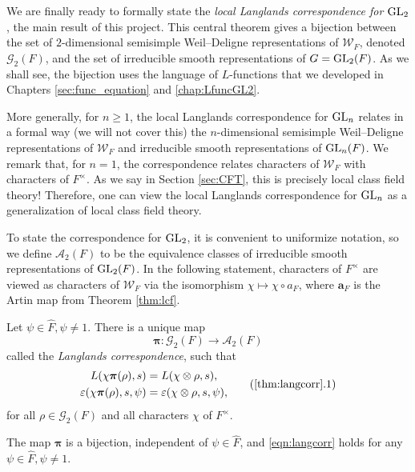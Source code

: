 We are finally ready to formally state the \textit{local Langlands correspondence for $\mathrm{GL}_2$}, the main result of this project. This central theorem gives a bijection between the set of $2$-dimensional semisimple Weil--Deligne representations of $\mathcal{W}_F$, denoted $\mathcal{G}_2(F)$, and the set of irreducible smooth representations of $G=\mathrm{GL}_2(F)$. As we shall see, the bijection uses the language of $L$-functions that we developed in Chapters \ref{sec:func_equation} and \ref{chap:LfuncGL2}. 

More generally, for $n\geq 1$, the local Langlands correspondence for $\mathrm{GL}_n$ relates in a formal way (we will not cover this) the $n$-dimensional semisimple Weil--Deligne representations of $\mathcal{W}_F$ and irreducible smooth representations of $\mathrm{GL}_n(F)$. We remark that, for $n=1$, the correspondence relates characters of $\mathcal{W}_F$ with characters of $F^\times$. As we say in Section \ref{sec:CFT}, this is precisely local class field theory! Therefore, one can view the local Langlands correspondence for $\mathrm{GL}_n$ as a generalization of local class field theory.

To state the correspondence for $\mathrm{GL}_2$, it is convenient to uniformize notation, so we define $\mathcal{A}_2(F)$ to be the equivalence classes of irreducible smooth representations of $\mathrm{GL}_2(F)$. In the following statement, characters of $F^\times$ are viewed as characters of $\mathcal{W}_F$ via the isomorphism $\chi\mapsto\chi\circ a_F$, where $\mathbf{a}_F$ is the Artin map from Theorem \ref{thm:lcf}.


\begin{thm}\label{thm:langcorr}
    Let $\psi\in\hat{F},\psi\neq 1$. There is a unique map 
    $$\bm\pi:\mathcal{G}_2(F)\longrightarrow\mathcal{A}_2(F)$$
    called the \textit{Langlands correspondence}, such that 
    \begin{equation}
        \begin{split}
            L(\chi\bm\pi(\rho),s)&=L(\chi\otimes\rho,s),\\
            \varepsilon(\chi\bm\pi(\rho),s,\psi)&=\varepsilon(\chi\otimes\rho,s,\psi),
        \end{split}
        \label{eqn:langcorr}\tag{\ref{thm:langcorr}.1}
    \end{equation}
    for all $\rho\in\mathcal{G}_2(F)$ and all characters $\chi$ of $F^\times$.

    The map $\bm\pi$ is a bijection, independent of $\psi\in\hat{F}$, and \eqref{eqn:langcorr} holds for any $\psi\in\hat{F}, \psi\neq1$.
\end{thm}

